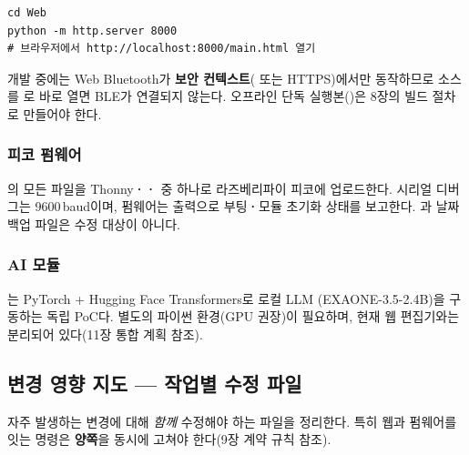 \begin{verbatim}
cd Web
python -m http.server 8000
# 브라우저에서 http://localhost:8000/main.html 열기
\end{verbatim}

\begin{infobox}[title=주의]
개발 중에는 Web Bluetooth가 \textbf{보안 컨텍스트}( 또는
HTTPS)에서만 동작하므로 소스를 로 바로 열면 BLE가 연결되지 않는다.
오프라인 단독 실행본()은 8장의 빌드 절차로 만들어야 한다.
\end{infobox}

\subsubsection{피코 펌웨어}

의 모든  파일을 Thonny\textbf{·}\textbf{·}
중 하나로 라즈베리파이 피코에 업로드한다. 시리얼 디버그는 9600\,baud이며,
펌웨어는  출력으로 부팅\textbf{·}모듈 초기화 상태를 보고한다.
과 날짜 백업 파일은 수정 대상이 아니다.

\subsubsection{AI 모듈}

는 PyTorch + Hugging Face Transformers로 로컬 LLM
(EXAONE-3.5-2.4B)을 구동하는 독립 PoC다. 별도의 파이썬 환경(GPU 권장)이
필요하며, 현재 웹 편집기와는 분리되어 있다(11장 통합 계획 참조).

\subsection{변경 영향 지도 --- 작업별 수정 파일}

자주 발생하는 변경에 대해 \emph{함께} 수정해야 하는 파일을 정리한다. 특히 웹과
펌웨어를 잇는 명령은 \textbf{양쪽}을 동시에 고쳐야 한다(9장 계약 규칙 참조).

